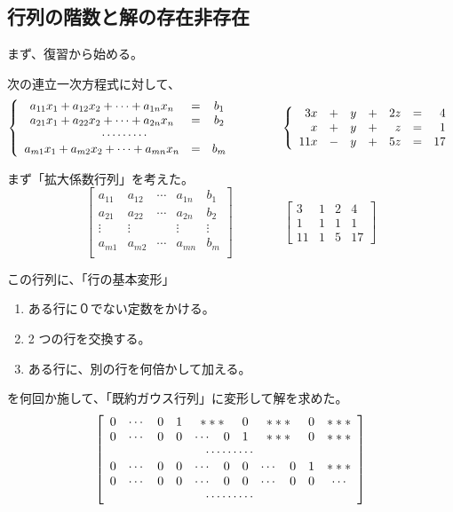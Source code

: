 \newpage
{}
\subsection{行列の階数と解の存在非存在}
まず、復習から始める。

\smallskip
次の連立一次方程式に対して、
$$\left\{\begin{array}{ccc}
a_{11}x_1 + a_{12}x_2 + \cdots + a_{1n}x_n & = & b_1\\
a_{21}x_1 + a_{22}x_2 + \cdots + a_{2n}x_n & = & b_2\\
\multicolumn{3}{c}{\cdots\cdots\cdots} \\
a_{m1}x_1 + a_{m2}x_2 + \cdots + a_{mn}x_n & = & b_m
\end{array}\right.\qquad\qquad 
\left\{\begin{array}{rrrrrrr}
3x & + & y  & + & 2z & = & 4\\
x & + & y & + & z & = & 1\\
11x & - & y & + & 5z & = & 17
\end{array}\right.$$

まず「拡大係数行列」を考えた。 
$$\left[\begin{array}{ccccc}
a_{11} & a_{12} & \cdots & a_{1n} & b_1\\
a_{21} & a_{22} & \cdots & a_{2n} & b_2\\
\vdots & \vdots &            & \vdots & \vdots\\
a_{m1} & a_{m2} & \cdots & a_{mn} & b_m\\
\end{array}
\right]\qquad\qquad 
\left[\begin{array}{rrrr}
3 & 1 & 2 & 4\\
1 & 1 & 1 &  1\\
11 & 1 & 5 & 17
\end{array}\right]$$

この行列に、「行の基本変形」
\begin{enumerate}
\item ある行に０でない定数をかける。
\item 2 つの行を交換する。
\item ある行に、別の行を何倍かして加える。
\end{enumerate}
を何回か施して、「既約ガウス行列」に変形して解を求めた。
$$\left[\begin{array}{ccccccccccc}
0 & \cdots & 0 & 1 & \multicolumn{2}{c}{***} & 0 & \multicolumn{2}{c}{***} & 0 & ***\\
0 & \cdots & 0 & 0 & \cdots & 0 & 1 & \multicolumn{2}{c}{***} & 0 & ***\\
\multicolumn{11}{c}{\cdots\cdots\cdots}\\
0 & \cdots & 0 & 0 & \cdots & 0 & 0 & \cdots & 0 & 1 & ***\\
0 & \cdots & 0 & 0 & \cdots & 0 & 0 & \cdots & 0 & 0 & \cdots\\
\multicolumn{11}{c}{\cdots\cdots\cdots}
\end{array}
\right]$$


